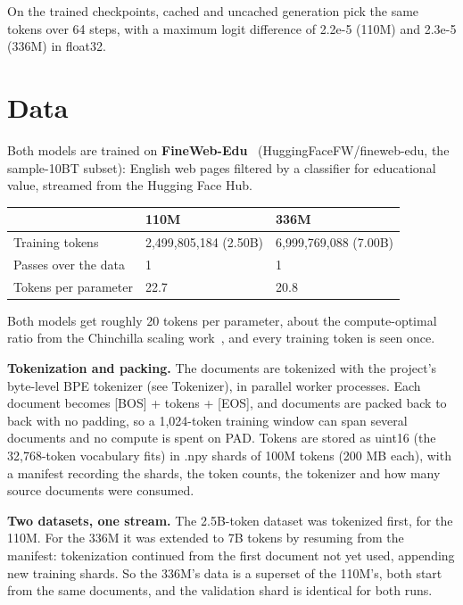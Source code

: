 \documentclass[11pt]{article}
\begin{document}
On the trained checkpoints, cached and uncached generation pick the same tokens over 64 steps, with a maximum logit difference of 2.2e-5 (110M) and 2.3e-5 (336M) in float32.

\section{Data}

Both models are trained on \textbf{FineWeb-Edu}~\citep{penedo2024fineweb} (HuggingFaceFW/\allowbreak{}fineweb-edu, the sample-10BT subset): English web pages filtered by a classifier for educational value, streamed from the Hugging Face Hub.

\begin{center}
\small
\begin{tabular}{lll}
\toprule
 & \textbf{110M} & \textbf{336M} \\
\midrule
Training tokens & 2,499,805,184 (2.50B) & 6,999,769,088 (7.00B) \\
Passes over the data & 1 & 1 \\
Tokens per parameter & 22.7 & 20.8 \\
\bottomrule
\end{tabular}
\end{center}

Both models get roughly 20 tokens per parameter, about the compute-optimal ratio from the Chinchilla scaling work~\citep{hoffmann2022chinchilla}, and every training token is seen once.

\textbf{Tokenization and packing.} The documents are tokenized with the project's byte-level BPE tokenizer (see Tokenizer), in parallel worker processes. Each document becomes [BOS] + tokens + [EOS], and documents are packed back to back with no padding, so a 1,024-token training window can span several documents and no compute is spent on PAD. Tokens are stored as uint16 (the 32,768-token vocabulary fits) in .npy shards of 100M tokens (200 MB each), with a manifest recording the shards, the token counts, the tokenizer and how many source documents were consumed.

\textbf{Two datasets, one stream.} The 2.5B-token dataset was tokenized first, for the 110M. For the 336M it was extended to 7B tokens by resuming from the manifest: tokenization continued from the first document not yet used, appending new training shards. So the 336M's data is a superset of the 110M's, both start from the same documents, and the validation shard is identical for both runs.
\end{document}

